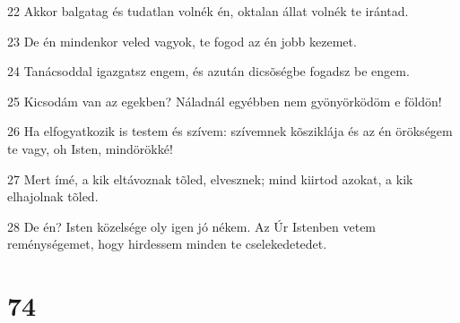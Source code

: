 \par 22 Akkor balgatag és tudatlan volnék én, oktalan állat volnék te irántad.
\par 23 De én mindenkor veled vagyok, te fogod az én jobb kezemet.
\par 24 Tanácsoddal igazgatsz engem, és azután dicsõségbe fogadsz be engem.
\par 25 Kicsodám van az egekben? Náladnál egyébben nem gyönyörködöm e földön!
\par 26 Ha elfogyatkozik is testem és szívem: szívemnek kõsziklája és az én örökségem te vagy, oh Isten, mindörökké!
\par 27 Mert ímé, a kik eltávoznak tõled, elvesznek; mind kiirtod azokat, a kik elhajolnak tõled.
\par 28 De én? Isten közelsége oly igen jó nékem. Az Úr Istenben vetem reménységemet, hogy hirdessem minden te cselekedetedet.

\chapter{74}

